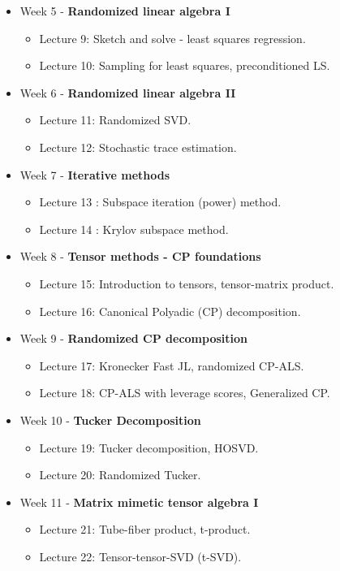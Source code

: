 \documentclass[a4paper,11pt]{article}
\begin{document}
\begin{itemize}
\item Week 5  - {\bf Randomized linear algebra I}
\begin{itemize}
\item Lecture 9: Sketch and solve - least squares regression. 
\item Lecture 10: Sampling for least squares, preconditioned LS. 
\end{itemize}


\item Week 6  - {\bf Randomized linear algebra II}
\begin{itemize}
\item Lecture 11: Randomized SVD.
\item Lecture 12: Stochastic trace estimation.
\end{itemize}

\item Week 7 - {\bf Iterative methods}
\begin{itemize}
\item Lecture 13 :  Subspace iteration (power) method.
\item Lecture 14 :  Krylov subspace method.
\end{itemize}

\item Week 8  - {\bf Tensor methods - CP foundations}
\begin{itemize}
\item Lecture 15:  Introduction to tensors, tensor-matrix product.
\item Lecture 16:  Canonical Polyadic (CP) decomposition.
\end{itemize}

\item Week 9   - {\bf Randomized CP decomposition}
\begin{itemize}
\item Lecture 17: Kronecker Fast JL, randomized CP-ALS.
\item Lecture 18: CP-ALS with leverage scores, Generalized CP.
\end{itemize}

\item Week 10  - {\bf Tucker Decomposition}
\begin{itemize}
\item Lecture 19: Tucker decomposition, HOSVD.
\item Lecture 20: Randomized Tucker.
\end{itemize}

\item Week 11  - {\bf Matrix mimetic tensor algebra I}
\begin{itemize}
\item Lecture 21: Tube-fiber product, t-product.
\item Lecture 22:  Tensor-tensor-SVD (t-SVD).
\end{itemize}


\end{itemize}
\end{document}
